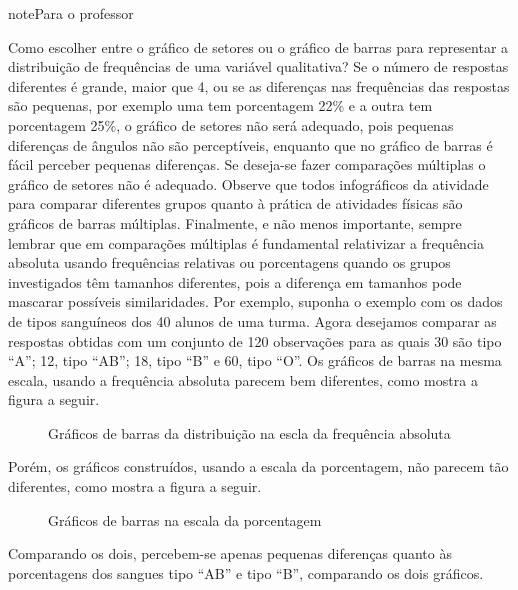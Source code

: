 \begin{sphinxadmonition}{note}{Para o professor}

Como escolher entre o gráfico de setores ou o gráfico de barras para representar a distribuição de frequências de uma variável qualitativa? Se o número de respostas diferentes é grande, maior que 4, ou se  as diferenças nas frequências das respostas são pequenas, por exemplo uma tem porcentagem 22\% e a outra tem porcentagem 25\%, o gráfico de setores não será adequado, pois pequenas diferenças de ângulos  não são perceptíveis, enquanto que no gráfico de barras é fácil perceber pequenas diferenças. Se deseja-se fazer comparações múltiplas o gráfico de setores não é adequado. Observe que todos infográficos da atividade para comparar diferentes grupos quanto à prática de atividades físicas são gráficos de barras múltiplas. Finalmente, e não menos importante, sempre lembrar que em comparações múltiplas é fundamental relativizar a frequência absoluta usando frequências relativas ou porcentagens quando os grupos investigados têm tamanhos diferentes, pois a diferença em tamanhos pode mascarar possíveis similaridades. Por exemplo, suponha o exemplo com os dados de tipos sanguíneos dos 40 alunos de uma turma. Agora desejamos comparar as respostas obtidas com um conjunto de 120 observações para as quais 30 são tipo ``A''; 12, tipo ``AB''; 18, tipo ``B'' e 60, tipo ``O''. Os gráficos de barras na mesma escala, usando a frequência absoluta parecem bem diferentes, como mostra a figura a seguir.

\begin{figure}[H]
\centering
\capstart

\noindent{}
\caption{Gráficos de barras da distribuição na escla da frequência absoluta}\label{\detokenize{PE103-1:fig-coloque-aqui-o-nome}}\label{\detokenize{PE103-1:id3}}\end{figure}

Porém, os gráficos construídos, usando a escala da porcentagem, não parecem tão diferentes, como mostra a figura a seguir.

\begin{figure}[H]
\centering
\capstart

\noindent{}
\caption{Gráficos de barras na escala da porcentagem}\label{\detokenize{PE103-1:id1}}\label{\detokenize{PE103-1:id4}}\end{figure}

Comparando os dois, percebem-se  apenas pequenas diferenças quanto às porcentagens dos sangues tipo ``AB'' e tipo ``B'', comparando os dois gráficos.
\end{sphinxadmonition}


